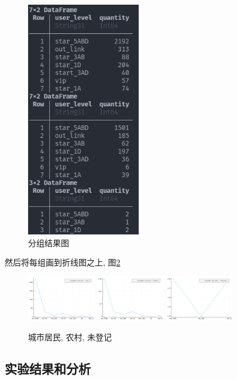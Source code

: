 \documentclass[a4paper]{article}
\begin{document}
\begin{figure}[ht]
 \centering
 \includegraphics[width=5cm]{images/网络分组.png}
 \caption{分组结果图}
 \label{fig:netgroup}
\end{figure}

然后将每组画到折线图之上, 图\ref{fig:city}
\begin{figure}
    \centering
    \includegraphics[width=3cm]{images/city.png}
    \includegraphics[width=3cm]{images/village.png}
    \includegraphics[width=3cm]{images/unknown.png}
    \caption{城市居民, 农村, 未登记}
    \label{fig:city}
\end{figure}

\subsection{实验结果和分析}\label{sub:ptxeva}
\end{document}
